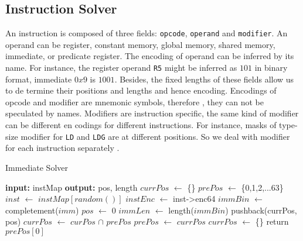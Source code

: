 \subsection{Instruction Solver}


An instruction is composed of three fields: {\tt opcode}, {\tt operand} and {\tt modifier}. An operand can be register, 
constant memory, global memory, shared memory, immediate, or predicate register.
The encoding of operand can be inferred by its name. For instance, the register operand {\tt R5} might be
inferred as $101$ in binary format, immediate $0x9$ is $1001$. Besides, the fixed lengths of these fields allow us to de
termine their positions and lengths and hence encoding. Encodings of opcode and modifier are mnemonic symbols, therefore
, they can not be speculated by names. Modifiers are instruction specific, the same kind of modifier can be different en
codings for different instructions. For instance, masks of type-size
modifier for {\tt LD} and {\tt LDG} are at different positions. So we deal with modifier for each instruction separately
. 


\begin{algorithm}
      \caption{Immediate Solver}
      \label{algo:int_solver}
  \begin{algorithmic}[1]
	  \State \textbf{input:} instMap
      \State \textbf{output:} pos, length
      \State $currPos$ $\gets$ \{\}
      \State $prePos$ $\gets$ \{0,1,2,...63\}
      \State $inst$ $\gets$ $instMap[random()]$
      \State $instEnc$ $\gets$ inst->enc64
      \State $immBin$ $\gets$ completement($imm$)
      \State $pos$ $\gets$ 0
      \State $immLen$ $\gets$ length($immBin$)
      \State pushback(currPos, pos)
      \EndIf
      \EndWhile
      \State $currPos$ $\gets$ $curPos$ $\cap$ $prePos$
      \State $prePos$ $\gets$ $currPos$
      \State $currPos$ $\gets$ \{\}
      \EndIf
      \EndWhile
      \State return $prePos[0]$
  \end{algorithmic}
\end{algorithm}

